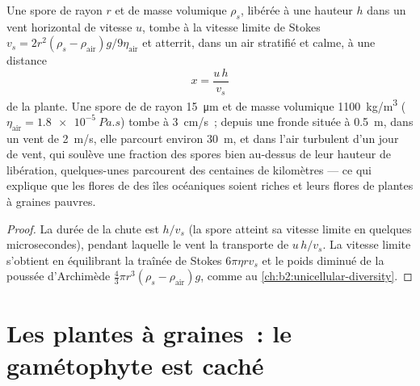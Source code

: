 \begin{theorem}\label{thm:b2:plant-life-cycles:dispersal}
Une spore de rayon $r$ et de masse volumique $\rho_s$, libérée à une
hauteur $h$ dans un vent horizontal de vitesse $u$, tombe à la vitesse
limite de Stokes
$v_s = 2r^2(\rho_s - \rho_{\text{air}})g/9\eta_{\text{air}}$
et atterrit, dans un air stratifié et calme, à une distance
\[
x = \frac{u\,h}{v_s}
\]
de la plante. Une spore de  de rayon \qty{15}{\micro m} et de
masse volumique \qty{1100}{kg/m^3} ($\eta_{\text{air}} = \qty{1.8e-5}{Pa.s}$)
tombe à \qty{3}{cm/s}~; depuis une fronde située à \qty{0.5}{m}, dans
un vent de \qty{2}{m/s}, elle parcourt environ \qty{30}{m}, et dans
l'air turbulent d'un jour de vent, qui soulève une fraction des spores
bien au-dessus de leur hauteur de libération, quelques-unes parcourent
des centaines de kilomètres --- ce qui explique que les flores de
 des îles océaniques soient riches et leurs flores de plantes à
graines pauvres.
\end{theorem}
\begin{proof}
La durée de la chute est $h/v_s$ (la spore atteint sa vitesse limite en
quelques microsecondes), pendant laquelle le vent la transporte de
$u\,h/v_s$. La vitesse limite s'obtient en équilibrant la traînée de
Stokes $6\pi\eta r
v_s$ et le poids diminué de la poussée d'Archimède $\tfrac43\pi r^3(\rho_s -
\rho_{\text{air}})g$, comme au \cref{ch:b2:unicellular-diversity}.
\end{proof}

\section{Les plantes à graines~: le gamétophyte est caché}

